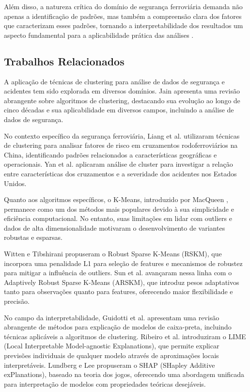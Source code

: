 \documentclass[conference]{IEEEtran}
\begin{document}
Além disso, a natureza crítica do domínio de segurança ferroviária demanda não apenas a identificação de padrões, mas também a compreensão clara dos fatores que caracterizam esses padrões, tornando a interpretabilidade dos resultados um aspecto fundamental para a aplicabilidade prática das análises \cite{guidotti2018survey}.

\subsection{Trabalhos Relacionados}
A aplicação de técnicas de clustering para análise de dados de segurança e acidentes tem sido explorada em diversos domínios. Jain \cite{jain2010data} apresenta uma revisão abrangente sobre algoritmos de clustering, destacando sua evolução ao longo de cinco décadas e sua aplicabilidade em diversos campos, incluindo a análise de dados de segurança.

No contexto específico da segurança ferroviária, Liang et al. \cite{liang2018analysis} utilizaram técnicas de clustering para analisar fatores de risco em cruzamentos rodoferroviários na China, identificando padrões relacionados a características geográficas e operacionais. Yan et al. \cite{yan2010analysis} aplicaram análise de cluster para investigar a relação entre características dos cruzamentos e a severidade dos acidentes nos Estados Unidos.

Quanto aos algoritmos específicos, o K-Means, introduzido por MacQueen \cite{macqueen1967some}, permanece como um dos métodos mais populares devido à sua simplicidade e eficiência computacional. No entanto, suas limitações em lidar com outliers e dados de alta dimensionalidade motivaram o desenvolvimento de variantes robustas e esparsas.

Witten e Tibshirani \cite{witten2010framework} propuseram o Robust Sparse K-Means (RSKM), que incorpora uma penalidade L1 para seleção de features e mecanismos de robustez para mitigar a influência de outliers. Sun et al. \cite{sun2018adaptive} avançaram nessa linha com o Adaptively Robust Sparse K-Means (ARSKM), que introduz pesos adaptativos tanto para observações quanto para features, oferecendo maior flexibilidade e precisão.

No campo da interpretabilidade, Guidotti et al. \cite{guidotti2018survey} apresentam uma revisão abrangente de métodos para explicação de modelos de caixa-preta, incluindo técnicas aplicáveis a algoritmos de clustering. Ribeiro et al. \cite{ribeiro2016should} introduziram o LIME (Local Interpretable Model-agnostic Explanations), que permite explicar previsões individuais de qualquer modelo através de aproximações locais interpretáveis. Lundberg e Lee \cite{lundberg2017unified} propuseram o SHAP (SHapley Additive exPlanations), baseado na teoria dos jogos, oferecendo uma abordagem unificada para interpretação de modelos com propriedades teóricas desejáveis.
\end{document}
